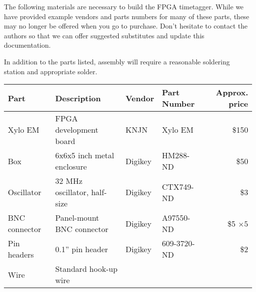 The following materials are necessary to build the FPGA
timetagger. While we have provided example vendors and parts numbers
for many of these parts, these may no longer be offered when you go to
purchase. Don't hesitate to contact the authors so that we can offer
suggested substitutes and update this documentation.

In addition to the parts listed, assembly will require a reasonable
soldering station and appropriate solder.

\begin{table}
  \center
  \begin{tabular}{|l|l|llr|}
    \hline
    Part & Description & Vendor & Part Number & Approx. price \\
    \hline
    Xylo EM    & FPGA development board               & KNJN      & Xylo EM & \$150 \\
    Box        & 6x6x5 inch metal enclosure           & Digikey   & HM288-ND & \$50 \\
    Oscillator & 32 MHz oscillator, half-size         & Digikey   & CTX749-ND & \$3 \\
    BNC connector & Panel-mount BNC connector         & Digikey   & A97550-ND & \$5 $\times 5$ \\
    Pin headers & 0.1'' pin header                    & Digikey   & 609-3720-ND	& \$2 \\
    Wire       & Standard hook-up wire                &           & \\
    \hline
  \end{tabular}
\end{table}


